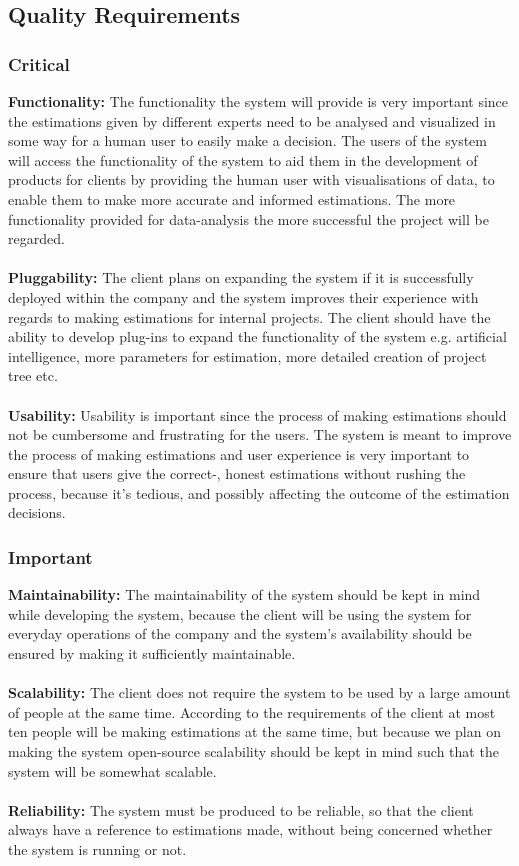 \subsection{Quality Requirements}
\subsubsection{Critical}
{\bfseries Functionality:} The functionality the system will provide is very important since the estimations given by different experts need to be analysed and visualized in some way for a human user to easily make a decision. The users of the system will access the functionality of the system to aid them in the development of products for clients by providing the human user with visualisations of data, to enable them to make more accurate and informed estimations. The more functionality provided for data-analysis the more successful the project will be regarded.
\\ \\
{\bfseries Pluggability:} The client plans on expanding the system if it is successfully deployed within the company and the system improves their experience with regards to making estimations for internal projects. The client should have the ability to develop plug-ins to expand the functionality of the system e.g. artificial intelligence, more parameters for estimation, more detailed creation of project tree etc.
\\ \\
{\bfseries Usability:} Usability is important since the process of making estimations should not be cumbersome and frustrating for the users. The system is meant to improve the process of making estimations and user experience is very important to ensure that users give the correct-, honest estimations without rushing the process, because it's tedious, and possibly affecting the outcome of the estimation decisions.

\subsubsection{Important}
{\bfseries Maintainability:} The maintainability of the system should be kept in mind while developing the system, because the client will be using the system for everyday operations of the company and the system's availability should be ensured by making it sufficiently maintainable.
\\ \\
{\bfseries Scalability:} The client does not require the system to be used by a large amount of people at the same time. According to the requirements of the client at most ten people will be making estimations at the same time, but because we plan on making the system open-source scalability should be kept in mind such that the system will be somewhat scalable.
	\\ \\
	{\bfseries Reliability:}
	The system must be produced to be reliable, so that the client always have a reference to estimations made, without being concerned whether the system is running or not.
